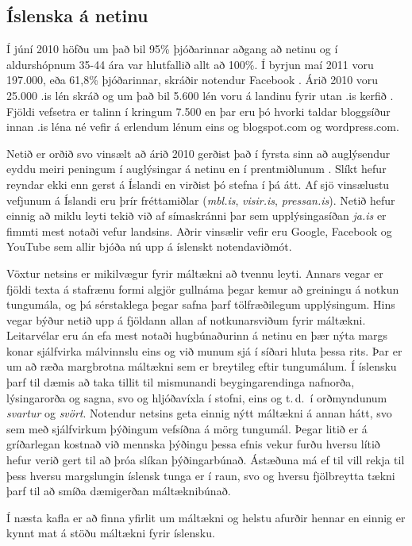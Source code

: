 \begin{multicols}{2}
\subsection{Íslenska á netinu}

Í júní 2010 höfðu um það bil 95\% þjóðarinnar aðgang að netinu \cite{sta1} og í aldurshópnum 35-44 ára var hlutfallið allt að 100\%. Í byrjun maí 2011 voru 197.000, eða 61,8\% þjóðarinnar, skráðir notendur Facebook \cite{fac1}.  
Árið 2010 voru 25.000 .is lén skráð \cite{len1} og um það bil 5.600 lén voru á landinu fyrir utan .is kerfið \cite{len2}. Fjöldi vefsetra er talinn í kringum 7.500 en þar eru þó hvorki taldar bloggsíður innan .is léna né vefir á erlendum lénum eins og blogspot.com og wordpress.com.

Netið er orðið svo vinsælt að árið 2010 gerðist það í fyrsta sinn að auglýsendur eyddu meiri peningum í auglýsingar á netinu en í prentmiðlunum \cite{abs1}. Slíkt hefur reyndar ekki enn gerst á Íslandi en virðist þó stefna í þá átt. Af sjö vinsælustu vefjunum á Íslandi eru þrír fréttamiðlar (\textit{mbl.is}, \textit{visir.is}, \textit{pressan.is}). Netið hefur einnig að miklu leyti tekið við af símaskránni þar sem upplýsingasíðan \textit{ja.is} er fimmti mest notaði vefur landsins. Aðrir vinsælir vefir eru Google, Facebook og YouTube \cite{abs2} sem allir bjóða nú upp á íslenskt notendaviðmót.

Vöxtur netsins er mikilvægur fyrir máltækni að tvennu leyti. Annars vegar er fjöldi texta á stafrænu formi algjör gullnáma þegar kemur að greiningu á notkun tungumála, og þá sérstaklega þegar safna þarf tölfræðilegum upplýsingum. Hins vegar býður netið upp á fjöldann allan af notkunarsviðum fyrir máltækni.
Leitarvélar eru án efa mest notaði hugbúnaðurinn á netinu en þær nýta margs konar sjálfvirka málvinnslu eins og við munum sjá í síðari hluta þessa rits. Þar er um að ræða margbrotna máltækni sem er breytileg eftir tungumálum. Í íslensku þarf til dæmis að taka tillit til mismunandi beygingarendinga nafnorða, lýsingarorða og sagna, svo og hljóðavíxla í stofni, eins og t.\,d.~í orðmyndunum \textit{svartur} og \textit{svört}. Notendur netsins geta einnig nýtt máltækni á annan hátt, svo sem með sjálfvirkum þýðingum vefsíðna á mörg tungumál. Þegar litið er á gríðarlegan kostnað við mennska þýðingu þessa efnis vekur furðu hversu lítið hefur verið gert til að þróa slíkan þýðingarbúnað. Ástæðuna má ef til vill rekja til þess hversu margslungin íslensk tunga er í raun, svo og hversu fjölbreytta tækni þarf til að smíða dæmigerðan máltæknibúnað. 

Í næsta kafla er að finna yfirlit um máltækni og helstu afurðir hennar en einnig er kynnt mat á stöðu máltækni fyrir íslensku.

\end{multicols}

